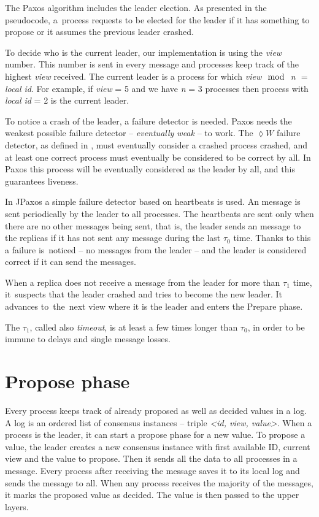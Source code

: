 The Paxos algorithm includes the leader election. As presented in the pseudocode, a~process requests to be elected for the leader if it has something to propose or it assumes the previous leader crashed.

To decide who is the current leader, our implementation is using the \textit{view} number. This number is sent in every message and processes keep track of the highest \textit{view} received. The current leader is a process for which \textit{view $\mod$ n $=$ local id}. For example, if \textit{view} = 5 and we have \textit{n} = 3 processes then process with \textit{local id} = 2 is the current leader.

To notice a crash of the leader, a failure detector is needed. Paxos needs the weakest possible failure detector -- \textit{eventually weak} -- to work. The $\lozenge W$ failure detector, as defined in \cite{chandra1996unreliable}, must eventually consider a crashed process crashed, and at least one correct process must eventually be considered to be correct by all. In Paxos this process will be eventually considered as the leader by all, and this guarantees liveness.

In JPaxos a simple failure detector based on heartbeats is used. An \alive message is sent periodically by the leader to all processes. The heartbeats are sent only when there are no other messages being sent, that is, the leader sends an \alive message to the replicas if it has not sent any message during the last $\tau_0$ time. Thanks to this a failure is~noticed -- no messages from the leader -- and the leader is considered correct if it can send the messages.

When a replica does not receive a message from the leader for more than $\tau_1$ time, it~suspects that the leader crashed and tries to become the new leader. It advances to~the~next view where it is the leader and enters the Prepare phase.

The $\tau_1$, called also \textit{timeout}, is at least a few times longer than $\tau_0$, in order to be immune to delays and single message losses.


\section{Propose phase} 

Every process keeps track of already proposed as well as decided values in a log. A log is an ordered list of consensus instances -- triple \textit{<id, view, value>}. When a process is the leader, it can start a propose phase for a new value. To propose a value, the leader creates a new consensus instance with first available ID, current view and the value to propose. Then it sends all the data to all processes in a \propose message. Every process after receiving the \propose message saves it to its local log and sends the \accept message to all. When any process receives the majority of the \accept messages, it marks the proposed value as decided. The value is then passed to the upper layers.

